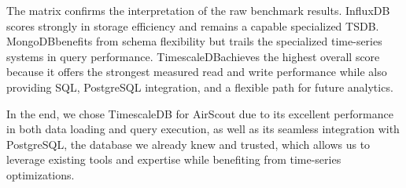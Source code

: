 The matrix confirms the interpretation of the raw benchmark results. InfluxDB\@
scores strongly in storage efficiency and remains a capable specialized TSDB\@.
MongoDB\@ benefits from schema flexibility but trails the specialized
time-series systems in query performance. TimescaleDB\@ achieves the highest
overall score because it offers the strongest measured read and write
performance while also providing SQL, PostgreSQL integration, and a flexible
path for future analytics.

In the end, we chose TimescaleDB for AirScout due to its excellent performance
in both data loading and query execution, as well as its seamless integration
with PostgreSQL, the database we already knew and trusted, which allows us to
leverage existing tools and expertise while benefiting from time-series
optimizations.
